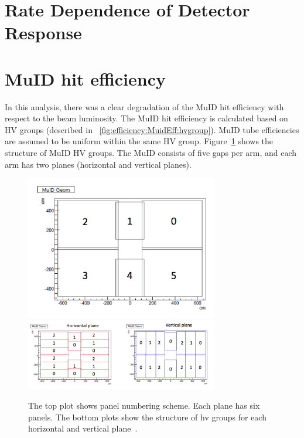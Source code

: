 \section{Rate Dependence of Detector Response}

\section{MuID hit efficiency}
In this analysis, there was a clear degradation of the MuID hit efficiency with
respect to the beam luminosity. The MuID hit efficiency is calculated based on
HV groups (described in ~\ref{fig:efficiency:MuidEff:hvgroup}). MuID tube
efficiencies are assumed to be uniform within the same HV group.
Figure~\ref{Fig:efficiency:MuidEff:hvgroup} shows the structure of MuID HV
groups. The MuID consists of five gaps per arm, and each arm has two planes
(horizontal and vertical planes).

\begin{figure}[ht]
  \centering
  \includegraphics[width=0.75\textwidth]{./figures/muid_panel_structure.pdf}
  \includegraphics[width=0.75\textwidth]{./figures/muid_hv_group.pdf}
  \caption{
    The top plot shows panel numbering scheme. Each plane has six panels. The
    bottom plots show the structure of hv groups for each horizontal and
    vertical plane~\cite{Seidl2014}.
  }
  \label{Fig:efficiency:MuidEff:hvgroup}
\end{figure}

